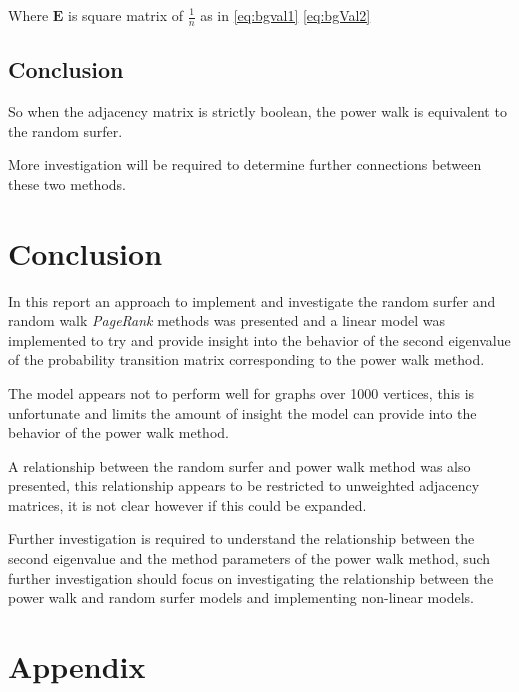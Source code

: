 \documentclass[11pt]{report}
\begin{document}
Where \(\mathbf{E}\) is square matrix of \(\frac{1}{n}\) as in \eqref{eq:bgval1}  \eqref{eq:bgVal2}

\subsection{Conclusion}
\label{sec:orgad79e88}
So when the adjacency matrix is strictly boolean, the power walk is equivalent to the random surfer.

More investigation will be required to determine further connections between these two methods.

\section{Conclusion}
\label{sec:orgc228632}
In this report an approach to implement and investigate the random surfer and random walk \emph{PageRank} methods was presented and a linear model was implemented to try and provide insight into the behavior of the second eigenvalue of the probability transition matrix corresponding to the power walk method.

The model appears not to perform well for graphs over 1000 vertices, this is unfortunate and limits the amount of insight the model can provide into the behavior of the power walk method.

A relationship between the random surfer and power walk method was also presented, this relationship appears to be restricted to unweighted adjacency matrices, it is not clear however if this could be expanded.

Further investigation is required to understand the relationship between the
second eigenvalue and the method parameters of the power walk method, such
further investigation should focus on investigating the relationship between the
power walk and random surfer models and implementing non-linear models.


\section{Appendix}
\label{sec:orgdf858c5}
\appendix
\end{document}
